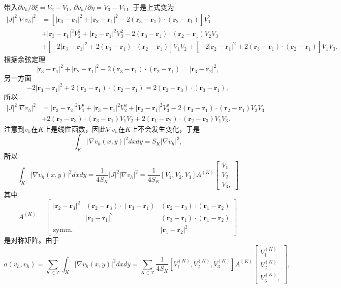 \documentclass[a4paper,10pt]{ctexart}
\begin{document}
带入$ \partial v_h / \partial \xi = V_2 - V_1,\ \partial v_h / \partial \eta = V_3 - V_1 $，于是上式变为
\[
    \begin{aligned}
        |J|^2 |\nabla v_h|^2 
        &= [|\bm{r}_3-\bm{r}_1|^2+|\bm{r}_2-\bm{r}_1|^2- 2(\bm{r}_3-\bm{r}_1)\cdot (\bm{r}_2-\bm{r}_1)]V_1^2 \\
        &+ |\bm{r}_3-\bm{r}_1|^2V_2^2 + |\bm{r}_2-\bm{r}_1|^2V_3^2 - 2(\bm{r}_3-\bm{r}_1)\cdot (\bm{r}_2-\bm{r}_1)V_2V_3 \\
        &+ [-2|\bm{r}_3-\bm{r}_1|^2+2(\bm{r}_3-\bm{r}_1)\cdot (\bm{r}_2-\bm{r}_1)]V_1V_2 + [-2|\bm{r}_2-\bm{r}_1|^2+2(\bm{r}_3-\bm{r}_1)\cdot (\bm{r}_2-\bm{r}_1)]V_1V_3.
    \end{aligned}
\]
根据余弦定理
\[
    |\bm{r}_3-\bm{r}_1|^2+|\bm{r}_2-\bm{r}_1|^2- 2(\bm{r}_3-\bm{r}_1)\cdot (\bm{r}_2-\bm{r}_1) = |\bm{r}_3-\bm{r}_2|^2,
\]
另一方面
\[
    -2|\bm{r}_3-\bm{r}_1|^2+2(\bm{r}_3-\bm{r}_1)\cdot (\bm{r}_2-\bm{r}_1) = 2(\bm{r}_2-\bm{r}_3)\cdot (\bm{r}_3-\bm{r}_1),
\]
所以
\[
    \begin{aligned}
        |J|^2 |\nabla v_h|^2 
        &= |\bm{r}_3-\bm{r}_2|^2V_1^2 + |\bm{r}_3-\bm{r}_1|^2V_2^2 + |\bm{r}_2-\bm{r}_1|^2V_3^2 - 2(\bm{r}_3-\bm{r}_1)\cdot (\bm{r}_2-\bm{r}_1)V_2V_3 \\
        &+ 2(\bm{r}_2-\bm{r}_3)\cdot (\bm{r}_3-\bm{r}_1)V_1V_2 + 2(\bm{r}_1-\bm{r}_2)\cdot (\bm{r}_2-\bm{r}_3)V_1V_3.
    \end{aligned}
\]
注意到$ v_h $在$ K $上是线性函数，因此$ \nabla v_h $在$ K $上不会发生变化，于是
\begin{equation}
    \int_K |\nabla v_h(x,y)|^2dxdy = S_K |\nabla v_h|^2,
\end{equation}
所以
\[
    \int_K |\nabla v_h(x,y)|^2dxdy = \frac{1}{4S_K}|J|^2 |\nabla v_h|^2 = \frac{1}{4S_K} [V_1,V_2,V_3]A^{(K)} \begin{bmatrix} 
        V_1 \\ V_2\\ V_3, 
    \end{bmatrix} 
\]
其中
\[
    A^{(K)}=\begin{bmatrix} 
        |\bm{r}_2-\bm{r}_3|^2 & (\bm{r}_2-\bm{r}_3)\cdot (\bm{r}_3-\bm{r}_1) & (\bm{r}_2-\bm{r}_3)\cdot (\bm{r}_1-\bm{r}_2)\\
         & |\bm{r}_3-\bm{r}_1|^2 & (\bm{r}_3-\bm{r}_1)\cdot (\bm{r}_1-\bm{r}_2)\\
        \text{symm.}    & & |\bm{r}_1-\bm{r}_2|^2
    \end{bmatrix}
\]
是对称矩阵。由于
\[
    a(v_h,v_h) = \sum_{K\in \mathcal{T}}\int_K |\nabla v_h(x,y)|^2dxdy = \sum_{K\in \mathcal{T}}\frac{1}{4S_K} [V^{(K)}_1,V^{(K)}_2,V^{(K)}_3]A^{(K)} \begin{bmatrix} 
        V^{(K)}_1 \\ V^{(K)}_2\\ V^{(K)}_3,
    \end{bmatrix},
\]
\end{document}
